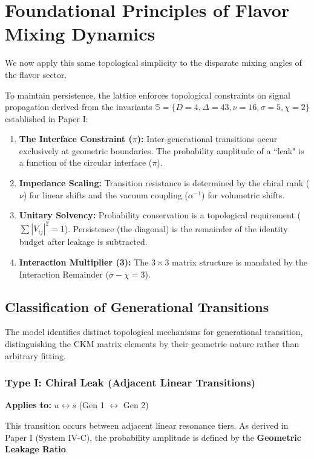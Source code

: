 

\section{Foundational Principles of Flavor Mixing Dynamics}
We now apply this same topological simplicity to the disparate mixing angles of the flavor sector.

To maintain persistence, the lattice enforces topological constraints on signal propagation derived from the invariants $\mathbb{S} = \{D=4, \Delta=43, \nu=16, \sigma=5, \chi=2\}$ established in Paper I:

\begin{enumerate}
    \item \textbf{The Interface Constraint ($\pi$):} Inter-generational transitions occur exclusively at geometric boundaries. The probability amplitude of a ``leak" is a function of the circular interface ($\pi$).
    \item \textbf{Impedance Scaling:} Transition resistance is determined by the chiral rank ($\nu$) for linear shifts and the vacuum coupling ($\alpha^{-1}$) for volumetric shifts.
    \item \textbf{Unitary Solvency:} Probability conservation is a topological requirement ($ \sum |V_{ij}|^2 = 1 $). Persistence (the diagonal) is the remainder of the identity budget after leakage is subtracted.
    \item \textbf{Interaction Multiplier (3):} The $3 \times 3$ matrix structure is mandated by the Interaction Remainder ($\sigma - \chi = 3$).
\end{enumerate}

\subsection{Classification of Generational Transitions}
The model identifies distinct topological mechanisms for generational transition, distinguishing the CKM matrix elements by their geometric nature rather than arbitrary fitting.

\subsubsection{Type I: Chiral Leak (Adjacent Linear Transitions)}
\textbf{Applies to:} $u \leftrightarrow s$ (Gen 1 $\leftrightarrow$ Gen 2)

This transition occurs between adjacent linear resonance tiers. As derived in Paper I (System IV-C), the probability amplitude is defined by the \textbf{Geometric Leakage Ratio}.

